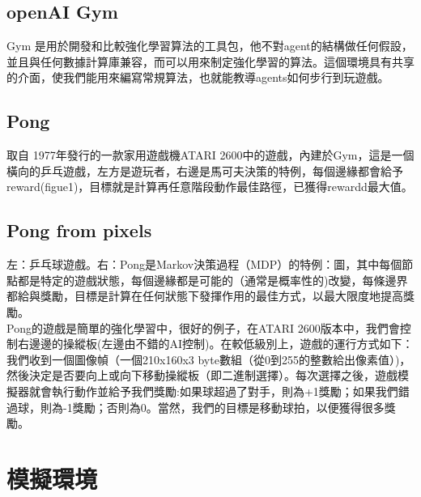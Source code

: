 \documentclass[14pt,a4paper]{report}  %
\begin{document}
\section{openAI Gym}
 Gym 是用於開發和比較強化學習算法的工具包，他不對agent的結構做任何假設，並且與任何數據計算庫兼容，而可以用來制定強化學習的算法。這個環境具有共享的介面，使我們能用來編寫常規算法，也就能教導agents如何步行到玩遊戲。\\[6pt]

\section{Pong}
 取自 1977年發行的一款家用遊戲機ATARI 2600中的遊戲，內建於Gym，這是一個橫向的乒乓遊戲，左方是遊玩者，右邊是馬可夫決策的特例，每個邊緣都會給予reward(figue1)，目標就是計算再任意階段動作最佳路徑，已獲得rewardd最大值。\\
\section{Pong from pixels}
 左：乒乓球遊戲。右：Pong是Markov決策過程（MDP）的特例：圖，其中每個節點都是特定的遊戲狀態，每個邊緣都是可能的（通常是概率性的)改變，每條邊界都給與獎勵，目標是計算在任何狀態下發揮作用的最佳方式，以最大限度地提高獎勵。\\ 
Pong的遊戲是簡單的強化學習中，很好的例子，在ATARI 2600版本中，我們會控制右邊邊的操縱板(左邊由不錯的AI控制)。在較低級別上，遊戲的運行方式如下：我們收到一個圖像幀（一個210x160x3 byte數組（從0到255的整數給出像素值）)，然後決定是否要向上或向下移動操縱板（即二進制選擇）。每次選擇之後，遊戲模擬器就會執行動作並給予我們獎勵:如果球超過了對手，則為+1獎勵；如果我們錯過球，則為-1獎勵；否則為0。當然，我們的目標是移動球拍，以便獲得很多獎勵。\\

\newpage
\chapter{模擬環境}
\end{document}
